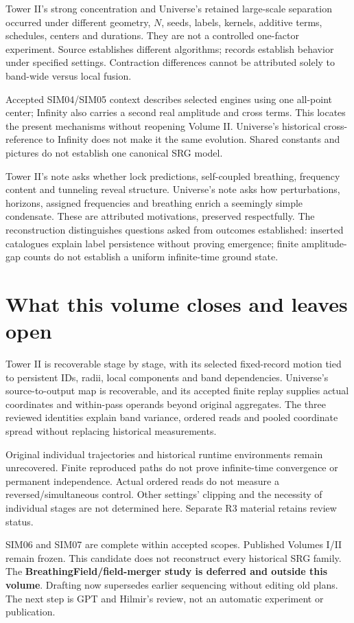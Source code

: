 Tower II's strong concentration and Universe's retained large-scale separation occurred under different geometry, \(N\), seeds, labels, kernels, additive terms, schedules, centers and durations. They are not a controlled one-factor experiment. Source establishes different algorithms; records establish behavior under specified settings. Contraction differences cannot be attributed solely to band-wide versus local fusion.

Accepted SIM04/SIM05 context describes selected engines using one all-point center; Infinity also carries a second real amplitude and cross terms. This locates the present mechanisms without reopening Volume II. Universe's historical cross-reference to Infinity does not make it the same evolution. Shared constants and pictures do not establish one canonical SRG model.

Tower II's note asks whether lock predictions, self-coupled breathing, frequency content and tunneling reveal structure. Universe's note asks how perturbations, horizons, assigned frequencies and breathing enrich a seemingly simple condensate. These are attributed motivations, preserved respectfully. The reconstruction distinguishes questions asked from outcomes established: inserted catalogues explain label persistence without proving emergence; finite amplitude-gap counts do not establish a uniform infinite-time ground state.

\section{What this volume closes and leaves open}\label{sec:limits}
Tower II is recoverable stage by stage, with its selected fixed-record motion tied to persistent IDs, radii, local components and band dependencies. Universe's source-to-output map is recoverable, and its accepted finite replay supplies actual coordinates and within-pass operands beyond original aggregates. The three reviewed identities explain band variance, ordered reads and pooled coordinate spread without replacing historical measurements.

Original individual trajectories and historical runtime environments remain unrecovered. Finite reproduced paths do not prove infinite-time convergence or permanent independence. Actual ordered reads do not measure a reversed/simultaneous control. Other settings' clipping and the necessity of individual stages are not determined here. Separate R3 material retains review status.

SIM06 and SIM07 are complete within accepted scopes. Published Volumes I/II remain frozen. This candidate does not reconstruct every historical SRG family. The \textbf{BreathingField/field-merger study is deferred and outside this volume}. Drafting now supersedes earlier sequencing without editing old plans. The next step is GPT and Hilmir's review, not an automatic experiment or publication.


